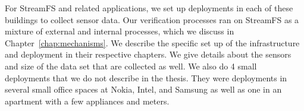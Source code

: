 For StreamFS and related applications, we set up deployments in each of these buildings to collect sensor data.  Our verification
processes ran on StreamFS as a mixture of external and internal processes, which we discuss in Chapter~\ref{chap:mechanisms}.
We describe the specific set up of the infrastructure and deployment in their respective chapters.  We give details 
about the sensors and size of the data set that are collected as well.
We also do 4 small deployments that we do not describe in the thesis.  They were deployments in several small office spaces at 
Nokia, Intel, and Samsung as well as one in an apartment with a few appliances and meters.




